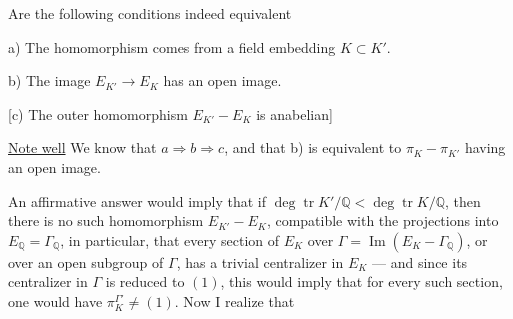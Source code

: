 Are the following conditions indeed equivalent

a) The homomorphism comes from a field embedding $K\subset K'$.

b) The image  $E_{K'}\longrightarrow E_K$ has an open image.

[c) The outer homomorphism $E_{K'}-E_K$ is anabelian]

\uline{Note well} We know that $a\Longrightarrow b\Longrightarrow c$, and that b) is equivalent to $\pi_K-\pi_{K'}$ having an open image.

An affirmative answer would imply that if $\deg\operatorname{tr}K'/\mathbb Q<\deg\operatorname{tr}K/\mathbb Q$, then there is no such homomorphism $E_{K'}-E_K$, compatible with the projections into $E_{\mathbb Q}=\Gamma_{\mathbb Q}$, in particular,   that  every section of $E_K$ over $\Gamma=\operatorname{Im}(E_K-\Gamma_{\mathbb Q})$, or over an open subgroup  of $\Gamma$, has a trivial centralizer in $E_K$ --- and since its centralizer in $\Gamma$ is reduced to $(1)$, this would imply that for every such section, one would have  $\pi_K^{\Gamma'}\ne(1)$. Now I realize that
